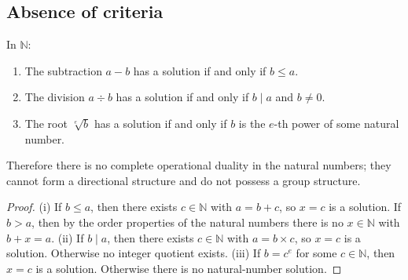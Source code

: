 \subsection{\texorpdfstring{Absence of criteria}{Absence of criteria}}

\begin{proposition}\label{prop:natural_no_inverse}
In $\mathbb{N}$:
\begin{enumerate}[label=(\roman*)]
    \item The subtraction $a - b$ has a solution if and only if $b \le a$.
    \item The division $a \div b$ has a solution if and only if $b \mid a$ and $b \neq 0$.
    \item The root $\sqrt[e]{b}$ has a solution if and only if $b$ is the $e$-th power of some natural number.
\end{enumerate}
Therefore there is no complete operational duality in the natural numbers; they cannot form a directional structure and do not possess a group structure.
\end{proposition}

\begin{proof}
(i) If $b \le a$, then there exists $c \in \mathbb{N}$ with $a = b + c$, so $x = c$ is a solution. If $b > a$, then by the order properties of the natural numbers there is no $x \in \mathbb{N}$ with $b + x = a$.
(ii) If $b \mid a$, then there exists $c \in \mathbb{N}$ with $a = b \times c$, so $x = c$ is a solution. Otherwise no integer quotient exists.
(iii) If $b = c^e$ for some $c \in \mathbb{N}$, then $x = c$ is a solution. Otherwise there is no natural-number solution.
\end{proof}

